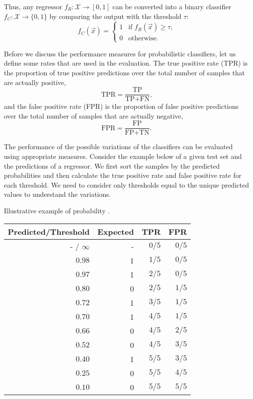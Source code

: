Thus, any regressor $f_R : \mathcal{X} \rightarrow [0, 1]$ can be converted into a binary
classifier $f_C : \mathcal{X} \rightarrow \{0, 1\}$ by comparing the output with the
threshold $\tau$:
\begin{equation*}
  f_C(\vec{x}) = \begin{cases}
    1 & \text{if } f_R(\vec{x}) \geq \tau\text{,} \\
    0 & \text{otherwise}\text{.}
  \end{cases}
\end{equation*}

Before we discuss the performance measures for probabilistic classifiers, let us define
some rates that are used in the evaluation.  The true positive rate (TPR) is the proportion
of true positive predictions over the total number of samples that are actually positive,
\begin{equation*}
  \text{TPR} = \frac{\text{TP}}{\text{TP} + \text{FN}}\text{,}
\end{equation*}
and the false positive rate (FPR) is the proportion of false positive predictions over the
total number of samples that are actually negative,
\begin{equation*}
  \text{FPR} = \frac{\text{FP}}{\text{FP} + \text{TN}}\text{.}
\end{equation*}

The performance of the possible variations of the classifiers can be evaluated using
appropriate measures.  Consider the example below of a given test set and the predictions
of a regressor.  We first sort the samples by the predicted probabilities and then
calculate the true positive rate and false positive rate for each threshold.
We need to consider only thresholds equal to the unique predicted values to understand the
variations.

\begin{tablebox}[label=tab:prob-reg-example]{Illustrative example of probability .}
  \centering
  \begin{tabular}{rrrr}
    \toprule
    \textbf{Predicted/Threshold} & \textbf{Expected} & \textbf{TPR} & \textbf{FPR}  \\
    \midrule
    - / $\infty$ & - & $0/5$ & $0/5$ \\
    $0.98$       & 1 & $1/5$ & $0/5$ \\
    $0.97$       & 1 & $2/5$ & $0/5$ \\
    $0.80$       & 0 & $2/5$ & $1/5$ \\
    $0.72$       & 1 & $3/5$ & $1/5$ \\
    $0.70$       & 1 & $4/5$ & $1/5$ \\
    $0.66$       & 0 & $4/5$ & $2/5$ \\
    $0.52$       & 0 & $4/5$ & $3/5$ \\
    $0.40$       & 1 & $5/5$ & $3/5$ \\
    $0.25$       & 0 & $5/5$ & $4/5$ \\
    $0.10$       & 0 & $5/5$ & $5/5$ \\
    \bottomrule
  \end{tabular}
\end{tablebox}

